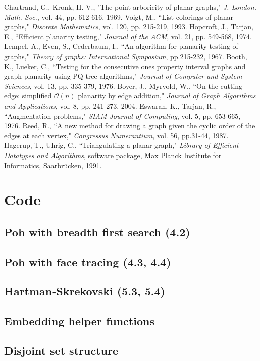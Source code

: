\documentclass[letterpaper, 12pt]{article}
\theoremstyle{definition}
\theoremstyle{definition}
\theoremstyle{thm}
\theoremstyle{definition}
\begin{document}
\begin{thebibliography}{99}
    Chartrand, G., Kronk, H. V., "The point-arboricity of planar graphs,"
    \textit{J. London. Math. Soc.}, vol. 44, pp. 612-616, 1969.
	Voigt, M., ``List colorings of planar graphs,"
	\textit{Discrete Mathematics}, vol. 120, pp. 215-219, 1993.
	Hopcroft, J., Tarjan, E., ``Efficient planarity testing," \textit{Journal of
	the ACM}, vol. 21, pp. 549-568, 1974.
	Lempel, A., Even, S., Cederbaum, I., ``An algorithm for planarity testing of
	graphs," \textit{Theory of graphs: International Symposium}, pp.215-232,
	1967.
	Booth, K., Lueker, C., ``Testing for the consecutive ones property interval
	graphs and graph planarity using PQ-tree algorithms," \textit{Journal of
	Computer and System Sciences}, vol. 13, pp. 335-379, 1976.
	Boyer, J., Myrvold, W., ``On the cutting edge: simplified $\mathcal{O}(n)$ planarity by
	edge addition," \textit{Journal of Graph Algorithms and Applications}, vol.
	8, pp. 241-273, 2004.
	Eswaran, K., Tarjan, R., ``Augmentation problems," \textit{SIAM Journal of
	Computing}, vol. 5, pp. 653-665, 1976.
	Reed, R., ``A new method for drawing a graph given the cyclic order of the
	edges at each vertex," \textit{Congressus Numerantium}, vol. 56, pp.31-44,
	1987.
	Hagerup, T., Uhrig, C., ``Triangulating a planar graph," \textit{Library of
	Efficient Datatypes and Algorithms}, software package, Max Planck Institute
	for Informatics, Saarbr{\"u}cken, 1991.
\end{thebibliography}

\appendix
\section{Code}
\subsection{Poh with breadth first search (4.2)}

\subsection{Poh with face tracing (4.3, 4.4)}

\subsection{Hartman-Skrekovski (5.3, 5.4)}

\subsection{Embedding helper functions}

\subsection{Disjoint set structure}
\end{document}
